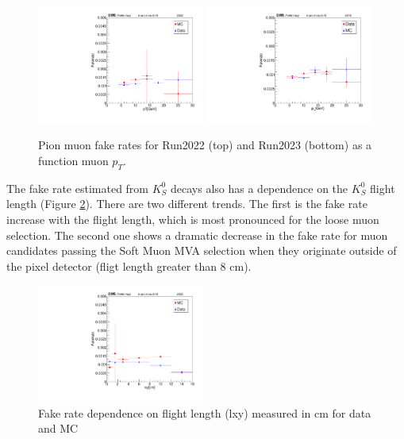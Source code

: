 \begin{figure}[!h]
  \begin{center}
    \includegraphics[width=0.49\textwidth]{figures/chapter4/fakerate/Run2022_pion-fakes.pdf}
    \includegraphics[width=0.49\textwidth]{figures/chapter4/fakerate/Run2023_pion-fakes.pdf}
    \caption{Pion muon fake rates for Run2022 (top) and
      Run2023 (bottom) as a function muon $p_{T}$.}
    \label{fig:fakerates}
  \end{center}
\end{figure}


The fake rate estimated from $K_S^0$ decays also has a dependence on the $K_S^0$ flight length (Figure \ref{fig:pion_fake_rate_fs_flight_length}). There are two different trends. The first is the fake rate increase with the flight length, which is most pronounced for the loose muon selection. The second one shows a dramatic decrease in the fake rate for muon candidates passing the Soft Muon MVA selection when they originate outside of the pixel detector (fligt length greater than 8 cm).

\begin{figure}[!h]
  \begin{center}
    \includegraphics[width=0.49\textwidth]{figures/chapter4/fakerate/playV0-ks_kin_lxy_muidbdt45_MC_v_Data_overlay.pdf}
  \end{center}
  \caption{Fake rate dependence on flight length (lxy) measured in cm for data and MC}
  \label{fig:pion_fake_rate_fs_flight_length}
\end{figure}

